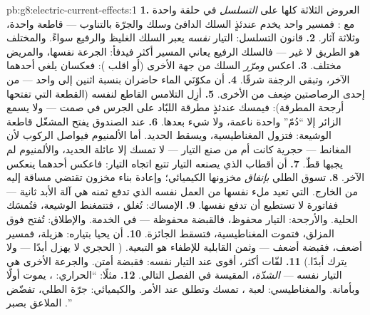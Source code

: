 \begin{solution}{pb:g8:electric-current-effects:1}
\textbf{1.} العروض الثلاثة كلها على \emph{التسلسل} في حلقة
واحدة مع : فمسير واحد يخدم عندئذٍ السلك الدافئ وسلك
 والجرّة بالتناوب --- قاطعة واحدة، وثلاثة آثار.
\textbf{2.} قانون التسلسل: التيار \emph{نفسه} يعبر السلك
الغليظ والرفيع سواءً. والمختلف هو الطريق لا غير --- فالسلك
الرفيع يعاني المسير أكثر فيدفأ: الجرعة نفسها، والمريض مختلف.
\textbf{3.} اعكس  \emph{ومرّر} السلك من جهة 
الأخرى (أو اقلب ): فعكسان يلغي أحدهما الآخر، وتبقى
الرجفة شرقًا.
\textbf{4.} أن مكوّنَي الماء حاضران بنسبة اثنين إلى واحد ---
 من إحدى الرصاصتين ضِعف  من الأخرى.
\textbf{5.} أزِل التلامس القاطع لنفسه (القطعة التي تفتحها
أرجحة المطرقة): فيمسك  عندئذٍ مطرقة اللبّاد
على الجرس في صمت --- ولا يسمع الزائر إلا ``دُمّ'' واحدة
ناعمة، ولا شيء بعدها.
\textbf{6.} عند الصندوق يفتح المشغّل قاطعة الوشيعة: فتزول
المغناطيسية، ويسقط الحديد. أما الألمنيوم فيواصل الركوب لأن
المغانط --- حجرية كانت أم من صنع التيار --- لا تمسك إلا عائلة
الحديد، والألمنيوم لم يجبها قطّ.
\textbf{7.} أن أقطاب  الذي يصنعه التيار تتبع اتجاه
التيار: فاعكس أحدهما ينعكس الآخر.
\textbf{8.}  تسوق الطلي \emph{بإنفاق} مخزونها
الكيميائي؛ وإعادة بناء مخزون تقتضي  مساقة إليه من الخارج.
 التي تعيد ملء نفسها من العمل نفسه الذي تدفع ثمنه هي
آلة الأبد ثانية --- ففاتورة  لا تستطيع أن تدفع نفسها.
\textbf{9.} الإمساك: تُغلق ، فتتمغنط الوشيعة، فتُمسَك
الحلية. والأرجحة: التيار محفوظ، فالقبضة محفوظة ---  في الخدمة. والإطلاق: تُفتح  فوق المزلق،
فتموت المغناطيسية، فتسقط الجائزة.
\textbf{10.} أن  يحيا بتياره: 
هزيلة، فمسير أضعف، فقبضة أضعف --- وثمن القابلية للإطفاء هو
التبعية. ( الحجري لا يهزل أبدًا --- ولا يترك
أبدًا.)
\textbf{11.} لفّات أكثر،  أقوى عند التيار نفسه: فقبضة
أمتن. والجرعة الأخرى هي  التيار نفسه --- \emph{الشدّة}،
المقيسة في الفصل التالي.
\textbf{12.} مثلًا: ``الحراري: ، يموت أولًا وبأمانة.
والمغناطيسي: لعبة ، تمسك وتطلق عند الأمر. والكيميائي:
جرّة الطلي، تفضّض الملاعق بصبر .''
\end{solution}
